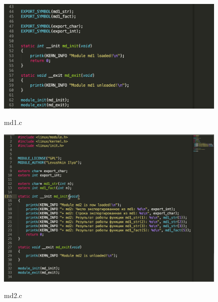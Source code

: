 \documentclass[a4paper,12pt]{article}
\begin{document}
	\begin{figure}[h!]
		\begin{center}
			{\includegraphics[scale = 0.65]{listing_md1_2.png}}
			\label{listing_md1_2}
		\end{center}
		\caption{md1.c}
	\end{figure}

	\begin{figure}[h!]
		\begin{center}
			{\includegraphics[scale = 0.65]{listing_md2.png}}
			\label{listing_md2}
		\end{center}
		\caption{md2.c}
	\end{figure}

	\newpage
\end{document}
